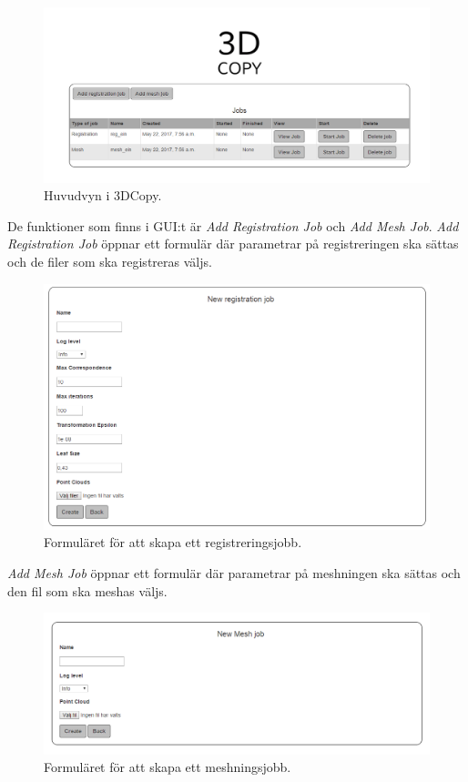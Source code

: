 \begin{figure}[H]
	\centering
	\includegraphics[width=130mm]{figures/3DCopyGUIWeb.PNG}
	\caption{Huvudvyn i 3DCopy.}
	\label{fig:3DCopyGUIWeb}
\end{figure}

De funktioner som finns i GUI:t är \textit{Add Registration Job} och \textit{Add Mesh Job}. \textit{Add Registration Job} öppnar ett formulär där parametrar på registreringen ska sättas och de filer som ska registreras väljs.

\begin{figure}[H]
	\centering
	\includegraphics[width=130mm]{figures/3DCopyGUIRegJobForm.PNG}
	\caption{Formuläret för att skapa ett registreringsjobb.}
	\label{fig:3DCopyGUIRegJobForm}
\end{figure}

\textit{Add Mesh Job} öppnar ett formulär där parametrar på meshningen ska sättas och den fil som ska meshas väljs.

\begin{figure}[H]
	\centering
	\includegraphics[width=130mm]{figures/3DCopyGUIMeshJobForm.PNG}
	\caption{Formuläret för att skapa ett meshningsjobb.}
	\label{fig:3DCopyGUIMeshJobForm}
\end{figure}


